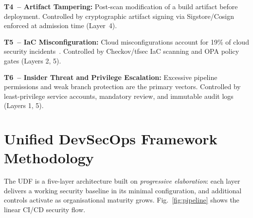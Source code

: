 \documentclass[letterpaper, 10pt, conference]{ieeeconf}
\begin{document}
\textbf{T4~-- Artifact Tampering:} Post-scan modification of a build
artifact before deployment. Controlled by cryptographic artifact signing
via Sigstore/Cosign enforced at admission time (Layer~4).

\textbf{T5~-- IaC Misconfiguration:} Cloud misconfigurations account
for 19\% of cloud security incidents~\cite{solanke2022}. Controlled by
Checkov/tfsec IaC scanning and OPA policy gates (Layers 2, 5).

\textbf{T6~-- Insider Threat and Privilege Escalation:} Excessive
pipeline permissions and weak branch protection are the primary vectors.
Controlled by least-privilege service accounts, mandatory review, and
immutable audit logs (Layers 1, 5).

\section{Unified DevSecOps Framework Methodology}

The UDF is a five-layer architecture built on \emph{progressive
elaboration}: each layer delivers a working security baseline in its
minimal configuration, and additional controls activate as organisational
maturity grows. Fig.~\ref{fig:pipeline} shows the linear CI/CD security
flow.
\end{document}
